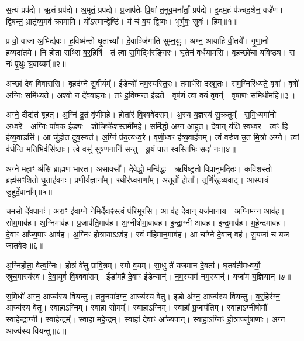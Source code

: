स॒त्यं प्रप॑द्ये।
ऋ॒तं प्रप॑द्ये।
अ॒मृतं॒ प्रप॑द्ये।
प्र॒जा\-प॑तेः प्रि॒यां त॒नुव॒मना᳚र्तां॒ प्रप॑द्ये।
इ॒दम॒हं प॑ञ्चद॒शेन॒ वज्रे॑ण।
द्वि॒षन्तं॒ भ्रातृ॑व्य॒मव॑ क्रामामि।
यो᳚ऽस्मान्द्वेष्टि॑।
यं च॑ व॒यं द्वि॒ष्मः।
भूर्भुवः॒ सुवः॑।
हिम्॥१॥\ip\anuvakamend[स॒त्यं दश॑]

प्र वो॒ वाजा॑ अ॒भिद्य॑वः।
ह॒विष्म॑न्तो घृ॒ताच्या᳚।
दे॒वाञ्जि॑गाति सुम्न॒युः।
अग्न॒ आया॑हि वी॒तये᳚।
गृ॒णा॒नो ह॒व्यदा॑तये।
नि होता॑ सथ्सि ब॒र्॒हिषि॑।
तं त्वा॑ स॒मिद्भि॑रङ्गिरः।
घृ॒तेन॑ वर्धयामसि।
बृ॒हच्छो॑चा यविष्ठ्य।
स नः॑ पृ॒थुः श्र॒वाय्यम्᳚॥२॥\ip

अच्छा॑ देव विवाससि।
बृ॒हद॑ग्ने सु॒वीर्यम्᳚।
ई॒डेन्यो॑ नम॒स्य॑स्ति॒रः।
तमाꣳ॑सि दर्‌\mbox{}श॒तः।
सम॒ग्निरि॑ध्यते॒ वृषा᳚।
वृषो॑ अ॒ग्निः समि॑ध्यते।
अश्वो॒ न दे॑व॒वाह॑नः।
तꣳ ह॒विष्म॑न्त ईडते।
वृष॑णं त्वा व॒यं वृषन्॑।
वृषा॑णः॒ समि॑धीमहि॥३॥\ip

अग्ने॒ दीद्य॑तं बृ॒हत्।
अ॒ग्निं दू॒तं वृ॑णीमहे।
होता॑रं वि॒श्ववे॑दसम्।
अ॒स्य य॒ज्ञस्य॑ सु॒क्रतुम्᳚।
स॒मि॒ध्यमा॑नो अध्व॒रे।
अ॒ग्निः पा॑व॒क ईड्यः॑।
शो॒चिष्के॑श॒स्तमी॑महे।
समि॑द्धो अग्न आहुत।
दे॒वान् य॑क्षि स्वध्वर।
त्वꣳ हि ह॑व्य॒वाडसि॑।
आ जु॑होत दुव॒स्यत॑।
अ॒ग्निं प्र॑य॒त्य॑ध्व॒रे।
वृ॒णी॒ध्वꣳ ह॑व्य॒वाह॑नम्।
त्वं वरु॑ण उ॒त मि॒त्रो अ॑ग्ने।
त्वां व॑र्धन्ति म॒तिभि॒र्वसि॑ष्ठाः।
त्वे वसु॑ सुषण॒नानि॑ सन्तु।
यू॒यं पा॑त स्व॒स्तिभिः॒ सदा॑ नः॥४॥\ip\anuvakamend[श्र॒वाय्य॑मिधीम॒ह्यसि॑ स॒प्त च॑]

अग्ने॑ म॒हाꣳ अ॑सि ब्राह्मण भारत।
असा॒वसौ᳚।
दे॒वेद्धो॒ मन्वि॑द्धः।
ऋषि॑ष्टुतो॒ विप्रा॑नुमदितः।
क॒वि॒श॒स्तो ब्रह्म॑सꣳशितो घृ॒ताह॑वनः।
प्र॒णीर्य॒ज्ञाना᳚म्।
र॒थीर॑ध्व॒राणा᳚म्।
अ॒तूर्तो॒ होता᳚।
तूर्णि॑र्‌\mbox{}हव्य॒वाट्।
आस्पात्रं॑ जु॒हूर्दे॒वाना᳚म्॥५॥\ip

च॒म॒सो दे॑व॒पानः॑।
अ॒राꣳ इ॑वाग्ने ने॒मिर्दे॒वाꣴस्त्वं प॑रि॒भूर॑सि।
आ व॑ह दे॒वान् यज॑मानाय।
अ॒ग्निम॑ग्न॒ आव॑ह।
सोम॒माव॑ह।
अ॒ग्निमाव॑ह।
प्र॒जा\-प॑ति॒माव॑ह।
अ॒ग्नीषोमा॒वाव॑ह।
इ॒न्द्रा॒ग्नी आव॑ह।
इन्द्र॒माव॑ह।
म॒हे॒न्द्रमाव॑ह।
दे॒वाꣳ आ᳚ज्य॒पाꣳ आव॑ह।
अ॒ग्निꣳ हो॒त्रायाऽऽव॑ह।
स्वं म॑हि॒मान॒माव॑ह।
आ चा᳚ग्ने दे॒वान् वह॑।
सु॒यजा॑ च यज जातवेदः॥६॥\ip\anuvakamend[दे॒वाना॒मिन्द्र॒मा व॑ह॒ षट् च॑]

अ॒ग्निर्\mbox{}होता॒ वेत्व॒ग्निः।
हो॒त्रं वे᳚त्तु प्रावि॒त्रम्।
स्मो व॒यम्।
सा॒धु ते॑ यजमान दे॒वता᳚।
घृ॒तव॑तीमध्वर्यो॒ स्रुच॒मास्य॑स्व।
दे॒वा॒युवं॑ वि॒श्ववा॑राम्।
ईडा॑महै दे॒वाꣳ ई॒डेन्यान्॑।
न॒म॒स्याम॑ नम॒स्यान्॑।
यजा॑म य॒ज्ञियान्॑॥७॥\ip\anuvakamend[अ॒ग्निर्‌\mbox{}होता॒ नव॑]

स॒मिधो॑ अग्न॒ आज्य॑स्य वियन्तु।
तनू॒नपा॑दग्न॒ आज्य॑स्य वेतु।
इ॒डो अ॑ग्न॒ आज्य॑स्य वियन्तु।
ब॒र्॒हिर॑ग्न॒ आज्य॑स्य वेतु।
स्वाहा॒\-ऽग्निम्।
स्वाहा॒ सोमम्᳚।
स्वाहा॒\-ऽग्निम्।
स्वाहा᳚ प्र॒जा\-प॑तिम्।
स्वाहा॒\-ऽग्नीषोमौ᳚।
स्वाहे᳚न्द्रा॒ग्नी।
स्वाहेन्द्रम्᳚।
स्वाहा॑ महे॒न्द्रम्।
स्वाहा॑ दे॒वाꣳ आ᳚ज्य॒पान्।
स्वाहा॒\-ऽग्निꣳ हो॒त्राज्जु॑षा॒णाः।
अग्न॒ आज्य॑स्य वियन्तु॥८॥\ip\anuvakamend[इ॒न्द्रा॒ग्नी पञ्च॑ च]

